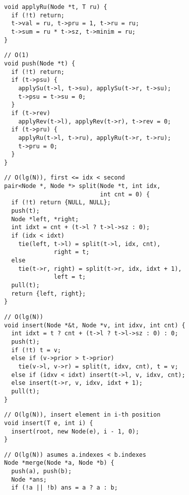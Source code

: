 \documentclass[twoside]{article}
\begin{document}
\begin{multicols*}{2}
\begin{verbatim}
  void applyRu(Node *t, T ru) {
    if (!t) return;
    t->val = ru, t->pru = 1, t->ru = ru;
    t->sum = ru * t->sz, t->minim = ru;
  }
\end{verbatim}
\vspace{-12pt}
\begin{verbatim}
  // O(1)
  void push(Node *t) {
    if (!t) return;
    if (t->psu) {
      applySu(t->l, t->su), applySu(t->r, t->su);
      t->psu = t->su = 0;
    }
    if (t->rev)
      applyRev(t->l), applyRev(t->r), t->rev = 0;
    if (t->pru) {
      applyRu(t->l, t->ru), applyRu(t->r, t->ru);
      t->pru = 0;
    }
  }
\end{verbatim}
\vspace{-12pt}
\begin{verbatim}
  // O(lg(N)), first <= idx < second
  pair<Node *, Node *> split(Node *t, int idx,
                             int cnt = 0) {
    if (!t) return {NULL, NULL};
    push(t);
    Node *left, *right;
    int idxt = cnt + (t->l ? t->l->sz : 0);
    if (idx < idxt)
      tie(left, t->l) = split(t->l, idx, cnt),
                right = t;
    else
      tie(t->r, right) = split(t->r, idx, idxt + 1),
                left = t;
    pull(t);
    return {left, right};
  }
\end{verbatim}
\vspace{-12pt}
\begin{verbatim}
  // O(lg(N))
  void insert(Node *&t, Node *v, int idxv, int cnt) {
    int idxt = t ? cnt + (t->l ? t->l->sz : 0) : 0;
    push(t);
    if (!t) t = v;
    else if (v->prior > t->prior)
      tie(v->l, v->r) = split(t, idxv, cnt), t = v;
    else if (idxv < idxt) insert(t->l, v, idxv, cnt);
    else insert(t->r, v, idxv, idxt + 1);
    pull(t);
  }
\end{verbatim}
\vspace{-12pt}
\begin{verbatim}
  // O(lg(N)), insert element in i-th position
  void insert(T e, int i) {
    insert(root, new Node(e), i - 1, 0);
  }
\end{verbatim}
\vspace{-12pt}
\begin{verbatim}
  // O(lg(N)) asumes a.indexes < b.indexes
  Node *merge(Node *a, Node *b) {
    push(a), push(b);
    Node *ans;
    if (!a || !b) ans = a ? a : b;

\end{verbatim}
\end{multicols*}
\end{document}
